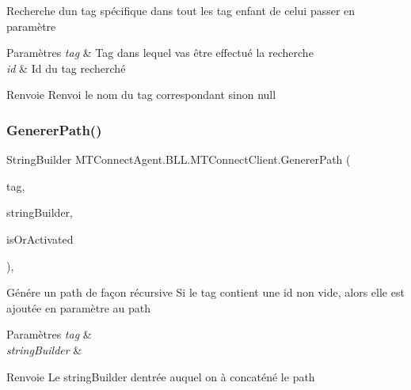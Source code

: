 Recherche d\textquotesingle{}un tag spécifique dans tout les tag enfant de celui passer en paramètre 


\begin{DoxyParams}{Paramètres}
{\em tag} & Tag dans lequel vas être effectué la recherche\\
\hline
{\em id} & Id du tag recherché\\
\hline
\end{DoxyParams}
\begin{DoxyReturn}{Renvoie}
Renvoi le nom du tag correspondant sinon null
\end{DoxyReturn}
\mbox{\label{class_m_t_connect_agent_1_1_b_l_l_1_1_m_t_connect_client_ad38815a224cb788630db2a3eb09d84c7}} 
\subsubsection{\texorpdfstring{Generer\+Path()}{GenererPath()}\hspace{0.1cm}{\footnotesize\ttfamily [1/2]}}
{\footnotesize\ttfamily String\+Builder M\+T\+Connect\+Agent.\+B\+L\+L.\+M\+T\+Connect\+Client.\+Generer\+Path (\begin{DoxyParamCaption}\item[{\mbox{\hyperlink{class_m_t_connect_agent_1_1_model_1_1_tag}{Tag}}}]{tag,  }\item[{String\+Builder}]{string\+Builder,  }\item[{bool}]{is\+Or\+Activated }\end{DoxyParamCaption})\hspace{0.3cm}{\ttfamily [inline]}, {\ttfamily [private]}}



Génére un path de façon récursive Si le tag contient une id non vide, alors elle est ajoutée en paramètre au path 


\begin{DoxyParams}{Paramètres}
{\em tag} & \\
\hline
{\em string\+Builder} & \\
\hline
\end{DoxyParams}
\begin{DoxyReturn}{Renvoie}
Le string\+Builder d\textquotesingle{}entrée auquel on à concaténé le path
\end{DoxyReturn}
\mbox{\label{class_m_t_connect_agent_1_1_b_l_l_1_1_m_t_connect_client_a00fd074e11835791343b6d0c9c74b5f8}} 

